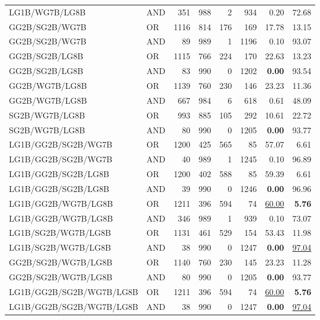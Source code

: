 \documentclass{article}
\begin{document}
{\begin{longtable}{llrrrrrr}
 LG1B/WG7B/LG8B           & AND     &  351 &  988 &    2 &  934 & 0.20              & 72.68             \\
 GG2B/SG2B/WG7B           & OR      & 1116 &  814 &  176 &  169 & 17.78             & 13.15             \\
 GG2B/SG2B/WG7B           & AND     &   89 &  989 &    1 & 1196 & 0.10              & 93.07             \\
 GG2B/SG2B/LG8B           & OR      & 1115 &  766 &  224 &  170 & 22.63             & 13.23             \\
 GG2B/SG2B/LG8B           & AND     &   83 &  990 &    0 & 1202 & \textbf{0.00}     & 93.54             \\
 GG2B/WG7B/LG8B           & OR      & 1139 &  760 &  230 &  146 & 23.23             & 11.36             \\
 GG2B/WG7B/LG8B           & AND     &  667 &  984 &    6 &  618 & 0.61              & 48.09             \\
 SG2B/WG7B/LG8B           & OR      &  993 &  885 &  105 &  292 & 10.61             & 22.72             \\
 SG2B/WG7B/LG8B           & AND     &   80 &  990 &    0 & 1205 & \textbf{0.00}     & 93.77             \\
 LG1B/GG2B/SG2B/WG7B      & OR      & 1200 &  425 &  565 &   85 & 57.07             & 6.61              \\
 LG1B/GG2B/SG2B/WG7B      & AND     &   40 &  989 &    1 & 1245 & 0.10              & 96.89             \\
 LG1B/GG2B/SG2B/LG8B      & OR      & 1200 &  402 &  588 &   85 & 59.39             & 6.61              \\
 LG1B/GG2B/SG2B/LG8B      & AND     &   39 &  990 &    0 & 1246 & \textbf{0.00}     & 96.96             \\
 LG1B/GG2B/WG7B/LG8B      & OR      & 1211 &  396 &  594 &   74 & \underline{60.00} & \textbf{5.76}     \\
 LG1B/GG2B/WG7B/LG8B      & AND     &  346 &  989 &    1 &  939 & 0.10              & 73.07             \\
 LG1B/SG2B/WG7B/LG8B      & OR      & 1131 &  461 &  529 &  154 & 53.43             & 11.98             \\
 LG1B/SG2B/WG7B/LG8B      & AND     &   38 &  990 &    0 & 1247 & \textbf{0.00}     & \underline{97.04} \\
 GG2B/SG2B/WG7B/LG8B      & OR      & 1140 &  760 &  230 &  145 & 23.23             & 11.28             \\
 GG2B/SG2B/WG7B/LG8B      & AND     &   80 &  990 &    0 & 1205 & \textbf{0.00}     & 93.77             \\
 LG1B/GG2B/SG2B/WG7B/LG8B & OR      & 1211 &  396 &  594 &   74 & \underline{60.00} & \textbf{5.76}     \\
 LG1B/GG2B/SG2B/WG7B/LG8B & AND     &   38 &  990 &    0 & 1247 & \textbf{0.00}     & \underline{97.04} \\

\end{longtable}
}
\end{document}
